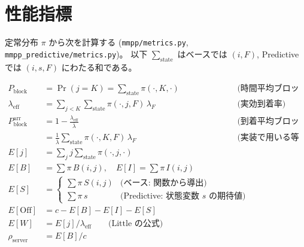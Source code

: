 \documentclass[a4paper,11pt]{article}
\newcommand{\code}[1]{\texttt{#1}}
\newcommand{\eff}{\mathrm{eff}}
\newcommand{\blk}{\mathrm{block}}
\begin{document}
\section{性能指標}
\label{sec:metrics}

定常分布 $\pi$ から次を計算する
(\code{mmpp/metrics.py}, \code{mmpp\_predictive/metrics.py})。
以下 $\sum_{\text{state}}$ はベースでは $(i,F)$, Predictive では $(i,s,F)$ にわたる和である。

\begin{align}
  P_\blk &= \Pr(j=K) = \sum_{\text{state}} \pi(\cdot,K,\cdot)
  &&\text{(時間平均ブロック確率)} \\
  \lambda_\eff &= \sum_{j<K}\sum_{\text{state}} \pi(\cdot,j,F)\,\lambda_F
  &&\text{(実効到着率)} \label{eq:lambda_eff}\\
  P_\blk^{\mathrm{arr}} &= 1-\frac{\lambda_\eff}{\bar\lambda}
  &&\text{(到着平均ブロック確率, 定義)} \label{eq:parr}\\
  &= \frac{1}{\bar\lambda}\sum_{\text{state}} \pi(\cdot,K,F)\,\lambda_F
  &&\text{(実装で用いる等価式)} \label{eq:parr_stable}\\
  E[j] &= \sum_{j} j \sum_{\text{state}} \pi(\cdot,j,\cdot) \\
  E[B] &= \sum \pi\, B(i,j),\quad
  E[I] = \sum \pi\, I(i,j) \\
  E[S] &= \begin{cases}
    \sum \pi\, S(i,j) & \text{(ベース: 関数から導出)}\\
    \sum \pi\, s      & \text{(Predictive: 状態変数 $s$ の期待値)}
  \end{cases}\\
  E[\mathrm{Off}] &= c-E[B]-E[I]-E[S] \\
  E[W] &= E[j]/\lambda_\eff \qquad\text{(Little の公式)} \\
  \rho_{\mathrm{server}} &= E[B]/c
\end{align}
\end{document}
